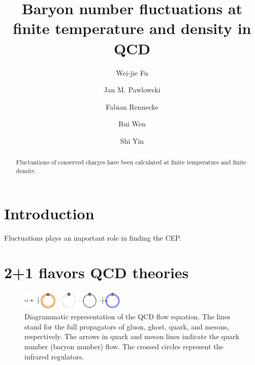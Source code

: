 \documentclass[%
reprint,
superscriptaddress,
showpacs,preprintnumbers,
amsmath,amssymb,
aps,
prd,
]{revtex4-1}
\begin{document}
	
\title{Baryon number fluctuations at finite temperature and density in QCD}
	
	

\author{Wei-jie Fu}

\author{Jan M. Pawlowski}
	
\author{Fabian Rennecke}
	
\author{Rui Wen}
	
\author{Shi Yin}
	
	
\begin{abstract}
Fluctuations of conserved charges have been calculated at finite temperature and finite density. 
\end{abstract}

\maketitle

	
\section{Introduction}\label{sec:int}

Fluctuations plays an important role in finding the CEP.
	
	
	
\section{2+1 flavors QCD  theories}
\label{sec:FRG}
	
%
\begin{figure}[t]
\includegraphics[width=0.45\textwidth]{QCD_equation}
\caption{Diagrammatic representation of the QCD flow equation. The lines stand for the full propagators of gluon, ghost, quark, and mesons, respectively. The arrows in quark and meson lines indicate the quark number (baryon number) flow. The crossed circles represent the infrared regulators.}\label{fig:QCD_equation}
\end{figure}
%
\end{document}
